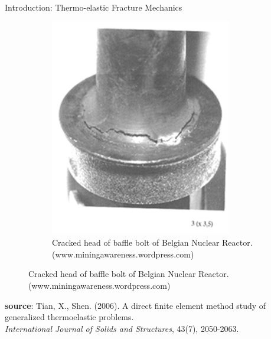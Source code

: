 \documentclass{beamer}
\begin{document}
\begin{frame}[t,fragile]{Introduction: Thermo-elastic Fracture Mechanics}
\begin{figure}[H]
\begin{subfigure}{0.45\textwidth}
    \centering
 \includegraphics[scale=.1]{fail.jpg}
 \caption{\tiny{Cracked head of baffle bolt of Belgian Nuclear Reactor.(www.miningawareness.wordpress.com)}}
 \label{fail}
 \end{subfigure}
 \end{figure}
 \vspace{-.3cm}
   \tiny
   \hspace{15pt}
   \textbf{source}: Tian, X., Shen. (2006). A direct finite element method study of generalized thermoelastic problems. \\
   \vspace{-7pt}
   \hspace{15pt}
   \emph{International Journal of Solids and Structures}, 43(7), 2050-2063.
\end{frame}
\end{document}
